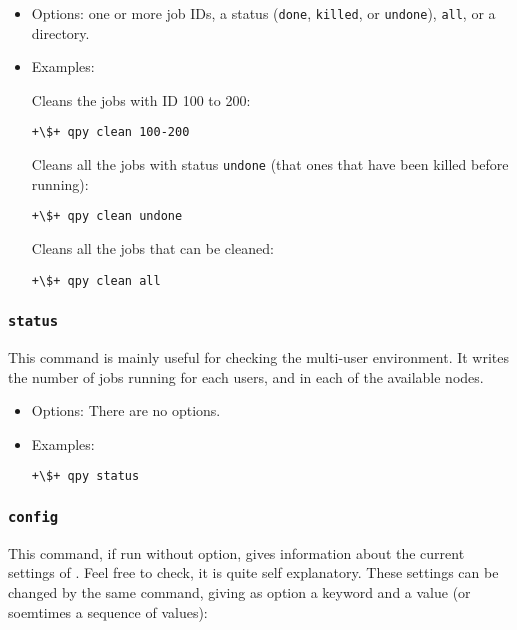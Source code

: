 \documentclass[a4paper,12pt]{article}
\begin{document}
\begin{itemize}
\item Options:
  one or more job IDs, a status (\texttt{done}, \texttt{killed}, or \texttt{undone}), \texttt{all}, or a directory.

\item Examples:

  Cleans the jobs with ID 100 to 200:

  \begin{lstlisting}[style=BashStyle]
+\$+ qpy clean 100-200
  \end{lstlisting}

  Cleans all the jobs with status \texttt{undone} (that ones that have been killed before running):

  \begin{lstlisting}[style=BashStyle]
+\$+ qpy clean undone
  \end{lstlisting}

  Cleans all the jobs that can be cleaned:

  \begin{lstlisting}[style=BashStyle]
+\$+ qpy clean all
  \end{lstlisting}
\end{itemize}

\subsubsection{\texttt{status}}

This command is mainly useful for checking the multi-user environment.
It writes the number of jobs running for each users, and in each of the available nodes.

\begin{itemize}
\item Options:
  There are no options.
  
\item Examples:

  \begin{lstlisting}[style=BashStyle]
+\$+ qpy status
  \end{lstlisting}
\end{itemize}

\subsubsection{\texttt{config}}

This command, if run without option, gives information about the current settings of \qpy{}.
Feel free to check, it is quite self explanatory.
These settings can be changed by the same command, giving as option a keyword and a value (or soemtimes a sequence of values):
\end{document}
